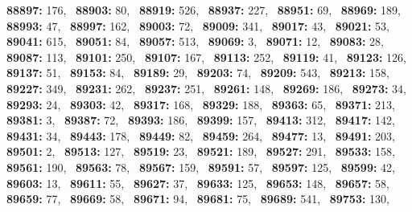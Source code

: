 \textbf{88897:} 176,\allowbreak~ 
\textbf{88903:} 80,\allowbreak~ 
\textbf{88919:} 526,\allowbreak~ 
\textbf{88937:} 227,\allowbreak~ 
\textbf{88951:} 69,\allowbreak~ 
\textbf{88969:} 189,\allowbreak~ 
\textbf{88993:} 47,\allowbreak~ 
\textbf{88997:} 162,\allowbreak~ 
\textbf{89003:} 72,\allowbreak~ 
\textbf{89009:} 341,\allowbreak~ 
\textbf{89017:} 43,\allowbreak~ 
\textbf{89021:} 53,\allowbreak~ 
\textbf{89041:} 615,\allowbreak~ 
\textbf{89051:} 84,\allowbreak~ 
\textbf{89057:} 513,\allowbreak~ 
\textbf{89069:} 3,\allowbreak~ 
\textbf{89071:} 12,\allowbreak~ 
\textbf{89083:} 28,\allowbreak~ 
\textbf{89087:} 113,\allowbreak~ 
\textbf{89101:} 250,\allowbreak~ 
\textbf{89107:} 167,\allowbreak~ 
\textbf{89113:} 252,\allowbreak~ 
\textbf{89119:} 41,\allowbreak~ 
\textbf{89123:} 126,\allowbreak~ 
\textbf{89137:} 51,\allowbreak~ 
\textbf{89153:} 84,\allowbreak~ 
\textbf{89189:} 29,\allowbreak~ 
\textbf{89203:} 74,\allowbreak~ 
\textbf{89209:} 543,\allowbreak~ 
\textbf{89213:} 158,\allowbreak~ 
\textbf{89227:} 349,\allowbreak~ 
\textbf{89231:} 262,\allowbreak~ 
\textbf{89237:} 251,\allowbreak~ 
\textbf{89261:} 148,\allowbreak~ 
\textbf{89269:} 186,\allowbreak~ 
\textbf{89273:} 34,\allowbreak~ 
\textbf{89293:} 24,\allowbreak~ 
\textbf{89303:} 42,\allowbreak~ 
\textbf{89317:} 168,\allowbreak~ 
\textbf{89329:} 188,\allowbreak~ 
\textbf{89363:} 65,\allowbreak~ 
\textbf{89371:} 213,\allowbreak~ 
\textbf{89381:} 3,\allowbreak~ 
\textbf{89387:} 72,\allowbreak~ 
\textbf{89393:} 186,\allowbreak~ 
\textbf{89399:} 157,\allowbreak~ 
\textbf{89413:} 312,\allowbreak~ 
\textbf{89417:} 142,\allowbreak~ 
\textbf{89431:} 34,\allowbreak~ 
\textbf{89443:} 178,\allowbreak~ 
\textbf{89449:} 82,\allowbreak~ 
\textbf{89459:} 264,\allowbreak~ 
\textbf{89477:} 13,\allowbreak~ 
\textbf{89491:} 203,\allowbreak~ 
\textbf{89501:} 2,\allowbreak~ 
\textbf{89513:} 127,\allowbreak~ 
\textbf{89519:} 23,\allowbreak~ 
\textbf{89521:} 189,\allowbreak~ 
\textbf{89527:} 291,\allowbreak~ 
\textbf{89533:} 158,\allowbreak~ 
\textbf{89561:} 190,\allowbreak~ 
\textbf{89563:} 78,\allowbreak~ 
\textbf{89567:} 159,\allowbreak~ 
\textbf{89591:} 57,\allowbreak~ 
\textbf{89597:} 125,\allowbreak~ 
\textbf{89599:} 42,\allowbreak~ 
\textbf{89603:} 13,\allowbreak~ 
\textbf{89611:} 55,\allowbreak~ 
\textbf{89627:} 37,\allowbreak~ 
\textbf{89633:} 125,\allowbreak~ 
\textbf{89653:} 148,\allowbreak~ 
\textbf{89657:} 58,\allowbreak~ 
\textbf{89659:} 77,\allowbreak~ 
\textbf{89669:} 58,\allowbreak~ 
\textbf{89671:} 94,\allowbreak~ 
\textbf{89681:} 75,\allowbreak~ 
\textbf{89689:} 541,\allowbreak~ 
\textbf{89753:} 130,\allowbreak~ 
